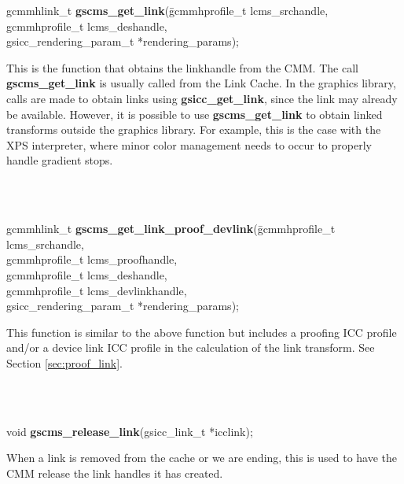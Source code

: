 \documentclass[12pt,notitlepage]{article}
\begin{document}
\begin{tabbing}
\noindent gcmmhlink\_t {\bf gscms\_get\_link}(\=gcmmhprofile\_t  lcms\_srchandle, gcmmhprofile\_t
lcms\_deshandle, \\
\> gsicc\_rendering\_param\_t
*rendering\_params);\\
\end{tabbing}

\begin{minipage}[h]{6.0in}
This is the function that obtains the linkhandle from the CMM.  The call {\bf gscms\_get\_link} is usually called from the Link Cache.  In the graphics library, calls are made to obtain links using {\bf gsicc\_get\_link}, since the link may already be available.  However, it is possible to use {\bf gscms\_get\_link} to obtain linked transforms outside the graphics library.  For example, this is the case with the XPS interpreter, where minor color management needs to occur to properly handle gradient stops.
\end{minipage}\\
\\

\begin{tabbing}
\noindent gcmmhlink\_t {\bf gscms\_get\_link\_proof\_devlink}(\=gcmmhprofile\_t  lcms\_srchandle,\\
\> gcmmhprofile\_t lcms\_proofhandle,\\
\> gcmmhprofile\_t lcms\_deshandle,\\
\> gcmmhprofile\_t lcms\_devlinkhandle,\\
\> gsicc\_rendering\_param\_t *rendering\_params);\\
\end{tabbing}

\begin{minipage}[h]{6.0in}
This function is similar to the above function but includes a proofing ICC profile and/or a device link ICC profile in the calculation of the link transform.  See Section \ref{sec:proof_link}.
\end{minipage}\\
\\

\begin{tabbing}
\noindent void {\bf gscms\_release\_link}(gsicc\_link\_t *icclink);\\
\end{tabbing}

\begin{minipage}[h]{6.0in}
When a link is removed from the cache or we are ending, this is used to have the CMM release the link handles it has created.
\end{minipage}\\
\\
\end{document}
